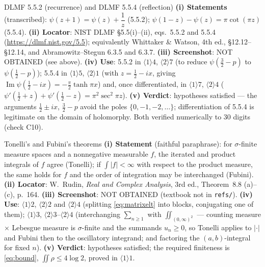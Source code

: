 \documentclass[11pt]{article}
\begin{document}
\begin{citedbox}{DLMF 5.5.2 (recurrence) and DLMF 5.5.4 (reflection)}
\textbf{(i) Statements} (transcribed): \(\psi(z+1)=\psi(z)+\dfrac1z\) (5.5.2);
\(\psi(1-z)-\psi(z)=\pi\cot(\pi z)\) (5.5.4).
\textbf{(ii) Locator}: NIST DLMF \S5.5(i)--(ii), eqs.~5.5.2 and 5.5.4
(\url{https://dlmf.nist.gov/5.5}); equivalently Whittaker \& Watson, 4th ed., \S12.12--\S12.14, and
Abramowitz--Stegun 6.3.5 and 6.3.7.
\textbf{(iii) Screenshot}: NOT OBTAINED (see above).
\textbf{(iv) Use}: 5.5.2 in \(\langle1\rangle4\), \(\langle2\rangle7\) (to reduce
\(\psi(\frac32-p)\) to \(\psi(\frac12-p)\)); 5.5.4 in \(\langle1\rangle5\), \(\langle2\rangle1\)
(with \(z=\frac12-ix\), giving \(\operatorname{Im}\psi(\frac12-ix)=-\frac\pi2\tanh\pi x\)) and, once
differentiated, in \(\langle1\rangle7\), \(\langle2\rangle4\)
(\(\psi'(\frac12+z)+\psi'(\frac12-z)=\pi^2\sec^2\pi z\)).
\textbf{(v) Verdict}: hypotheses satisfied --- the arguments \(\frac12\pm ix\), \(\frac32-p\) avoid
the poles \(\{0,-1,-2,\dots\}\); differentiation of 5.5.4 is legitimate on the domain of holomorphy.
Both verified numerically to \(30\) digits (check C10).
\end{citedbox}

\begin{citedbox}{Tonelli's and Fubini's theorems}
\textbf{(i) Statement} (faithful paraphrase): for \(\sigma\)-finite measure spaces and a
nonnegative measurable \(f\), the iterated and product integrals of \(f\) agree (Tonelli); if
\(\int|f|<\infty\) with respect to the product measure, the same holds for \(f\) and the order of
integration may be interchanged (Fubini).
\textbf{(ii) Locator}: W.~Rudin, \emph{Real and Complex Analysis}, 3rd ed., Theorem~8.8
(a)--(c), p.~164.
\textbf{(iii) Screenshot}: NOT OBTAINED (textbook not in \texttt{refs/}).
\textbf{(iv) Use}: \(\langle1\rangle2\), \(\langle2\rangle2\) and \(\langle2\rangle4\) (splitting
\eqref{eq:matrixelt} into blocks, conjugating one of them); \(\langle1\rangle3\),
\(\langle2\rangle3\)--\(\langle2\rangle4\) (interchanging \(\sum_{n\ge1}\) with
\(\iint_{(0,\infty)^2}\) --- counting measure \(\times\) Lebesgue measure is \(\sigma\)-finite and
the summands \(u_n\ge0\), so Tonelli applies to \(|{\cdot}|\) and Fubini then to the oscillatory
integrand; and factoring the \((a,b)\)-integral for fixed \(n\)).
\textbf{(v) Verdict}: hypotheses satisfied; the required finiteness is \eqref{eq:bound},
\(\iint\rho\le4\log2\), proved in \(\langle1\rangle1\).
\end{citedbox}
\end{document}
